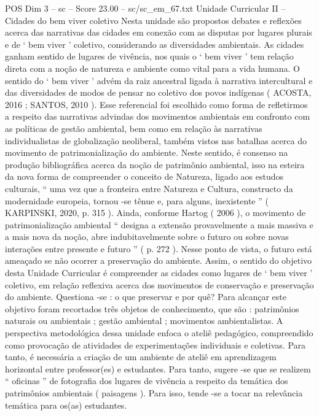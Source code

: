 \begin{textsample}{POS Dim 3 – sc – Score 23.00 – sc/sc\_em\_67.txt}
Unidade Curricular II – Cidades do bem viver coletivo Nesta unidade são propostos debates e reflexões acerca das narrativas das cidades em conexão com as disputas por lugares plurais e de ‘ bem viver ’ coletivo, considerando as diversidades ambientais.
As cidades ganham sentido de lugares de vivência, nos quais o ‘ bem viver ’ tem relação direta com a noção de natureza e ambiente como vital para a vida humana.
O sentido do ‘ bem viver ’ advém da raiz ancestral ligada à narrativa intercultural e das diversidades de modos de pensar no coletivo dos povos indígenas ( ACOSTA, 2016 ; SANTOS, 2010 ).
Esse referencial foi escolhido como forma de refletirmos a respeito das narrativas advindas dos movimentos ambientais em confronto com as políticas de gestão ambiental, bem como em relação às narrativas individualistas de globalização neoliberal, também vistos nas batalhas acerca do movimento de patrimonialização do ambiente.
Neste sentido, é consenso na produção bibliográfica acerca da noção de patrimônio ambiental, isso na esteira da nova forma de compreender o conceito de Natureza, ligado aos estudos culturais, “ uma vez que a fronteira entre Natureza e Cultura, constructo da modernidade europeia, tornou -se tênue e, para alguns, inexistente ” ( KARPINSKI, 2020, p. 315 ).
Ainda, conforme Hartog ( 2006 ), o movimento de patrimonialização ambiental “ designa a extensão provavelmente a mais massiva e a mais nova da noção, abre indubitavelmente sobre o futuro ou sobre novas interações entre presente e futuro ” ( p. 272 ).
Nesse ponto de vista, o futuro está ameaçado se não ocorrer a preservação do ambiente.
Assim, o sentido do objetivo desta Unidade Curricular é compreender as cidades como lugares de ‘ bem viver ’ coletivo, em relação reflexiva acerca dos movimentos de conservação e preservação do ambiente.
Questiona -se : o que preservar e por quê?
Para alcançar este objetivo foram recortados três objetos de conhecimento, que são : patrimônios naturais ou ambientais ; gestão ambiental ; movimentos ambientalistas.
A perspectiva metodológica dessa unidade enfoca o ateliê pedagógico, compreendido como provocação de atividades de experimentações individuais e coletivas.
Para tanto, é necessária a criação de um ambiente de ateliê em aprendizagem horizontal entre professor(es) e estudantes.
Para tanto, sugere -se que se realizem “ oficinas ” de fotografia dos lugares de vivência a respeito da temática dos patrimônios ambientais ( paisagens ).
Para isso, tende -se a tocar na relevância temática para os(as) estudantes.

\end{textsample}
